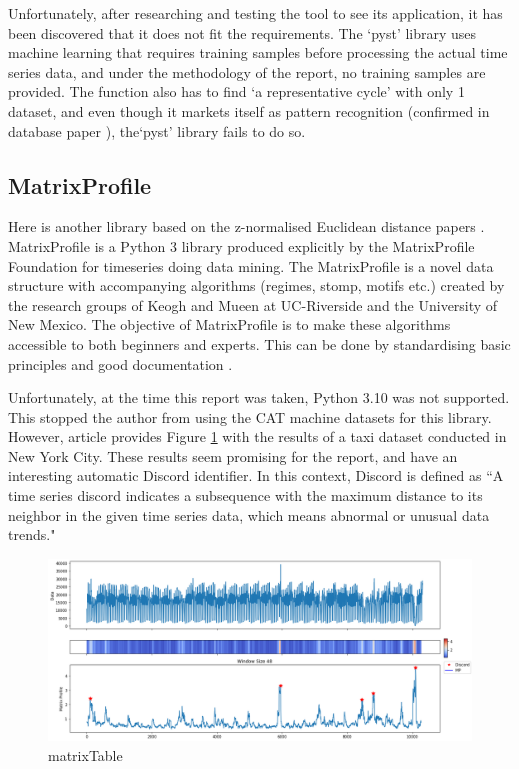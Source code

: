 Unfortunately, after researching and testing the tool to see its application, it has been discovered that it does not fit the requirements. The `pyst' library uses machine learning that requires training samples before processing the actual time series data, and under the methodology of the report, no training samples are provided. The function also has to find `a representative cycle' with only 1 dataset, and even though it markets itself as pattern recognition (confirmed in database paper \cite{DBLP:journals/corr/abs-2104-07406}), the`pyst' library fails to do so.

\subsection{MatrixProfile}
Here is another library based on the z-normalised Euclidean distance papers \cite{zhu_imamura_nikovski_keogh_2017}. MatrixProfile is a Python 3 library produced explicitly by the MatrixProfile Foundation for timeseries doing data mining. The MatrixProfile is a novel data structure with accompanying algorithms (regimes, stomp, motifs etc.) created by the research groups of Keogh and Mueen at UC-Riverside and the University of New Mexico. The objective of MatrixProfile is to make these algorithms accessible to both beginners and experts. This can be done by standardising basic principles and good documentation \cite{Van_Benschoten2020}. 

Unfortunately, at the time this report was taken, Python 3.10 was not supported. This stopped the author from using the CAT machine datasets for this library. However, article \cite{Van_Benschoten2020} provides Figure \ref{matrixTable} with the results of a taxi dataset conducted in New York City. These results seem promising for the report, and have an interesting automatic Discord identifier. In this context, Discord is defined as ``A time series discord indicates a subsequence with the maximum distance to its neighbor in the given time series data, which means abnormal or unusual data trends."\cite{woodbridge_wilson_rintoul_goldstein_2015}

\begin{figure}
\centering
\includegraphics[scale=0.40]{images/examples_NYC_Taxis_8_2.png}
\caption{matrixTable}
\label{matrixTable}
\end{figure}

